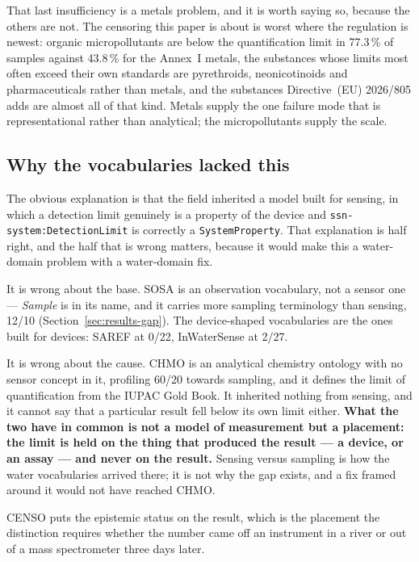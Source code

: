 That last insufficiency is a metals problem, and it is worth saying so, because
the others are not. The censoring this paper is about is worst where the
regulation is newest: organic micropollutants are below the quantification limit
in \num{77.3}\,\% of samples against \num{43.8}\,\% for the Annex~I metals,
the substances whose limits most often exceed their own standards are
pyrethroids, neonicotinoids and pharmaceuticals rather than metals, and the
substances Directive~(EU) 2026/805 adds are almost all of that kind. Metals
supply the one failure mode that is representational rather than analytical; the
micropollutants supply the scale.

\subsection{Why the vocabularies lacked this}
The obvious explanation is that the field inherited a model built for sensing,
in which a detection limit genuinely is a property of the device and
\texttt{ssn-system:DetectionLimit} is correctly a \texttt{SystemProperty}. That
explanation is half right, and the half that is wrong matters, because it would
make this a water-domain problem with a water-domain fix.

It is wrong about the base. SOSA is an observation vocabulary, not a sensor
one --- \emph{Sample} is in its name, and it carries more sampling terminology
than sensing, \num{12}/\num{10} (Section~\ref{sec:results-gap}). The
device-shaped vocabularies are the ones built for devices: SAREF at
\num{0}/\num{22}, InWaterSense at \num{2}/\num{27}.

It is wrong about the cause. CHMO is an analytical chemistry ontology with no
sensor concept in it, profiling \num{60}/\num{20} towards sampling, and it
defines the limit of quantification from the IUPAC Gold Book. It inherited
nothing from sensing, and it cannot say that a particular result fell below its
own limit either. \textbf{What the two have in common is not a model of
measurement but a placement: the limit is held on the thing that produced the
result --- a device, or an assay --- and never on the result.} Sensing versus
sampling is how the water vocabularies arrived there; it is not why the gap
exists, and a fix framed around it would not have reached CHMO.

CENSO puts the epistemic status on the result, which is the placement the
distinction requires whether the number came off an instrument in a river or
out of a mass spectrometer three days later.


